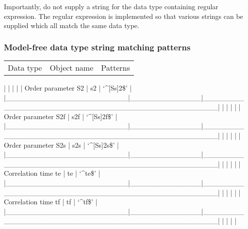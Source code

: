 Importantly, do not supply a string for the data type containing regular expression.  The
regular expression is implemented so that various strings can be supplied which all match
the same data type.


\subsubsection{Model-free data type string matching patterns}



\begin{tabular}{ccc}
Data type & Object name & Patterns \\
\end{tabular}
|                        |              |                                                  |
| Order parameter S2     | s2           | `\^{}[Ss]2\$'                                        |
|\_\_\_\_\_\_\_\_\_\_\_\_\_\_\_\_\_\_\_\_\_\_\_\_|\_\_\_\_\_\_\_\_\_\_\_\_\_\_|\_\_\_\_\_\_\_\_\_\_\_\_\_\_\_\_\_\_\_\_\_\_\_\_\_\_\_\_\_\_\_\_\_\_\_\_\_\_\_\_\_\_\_\_\_\_\_\_\_\_|
|                        |              |                                                  |
| Order parameter S2f    | s2f          | `\^{}[Ss]2f\$'                                       |
|\_\_\_\_\_\_\_\_\_\_\_\_\_\_\_\_\_\_\_\_\_\_\_\_|\_\_\_\_\_\_\_\_\_\_\_\_\_\_|\_\_\_\_\_\_\_\_\_\_\_\_\_\_\_\_\_\_\_\_\_\_\_\_\_\_\_\_\_\_\_\_\_\_\_\_\_\_\_\_\_\_\_\_\_\_\_\_\_\_|
|                        |              |                                                  |
| Order parameter S2s    | s2s          | `\^{}[Ss]2s\$'                                       |
|\_\_\_\_\_\_\_\_\_\_\_\_\_\_\_\_\_\_\_\_\_\_\_\_|\_\_\_\_\_\_\_\_\_\_\_\_\_\_|\_\_\_\_\_\_\_\_\_\_\_\_\_\_\_\_\_\_\_\_\_\_\_\_\_\_\_\_\_\_\_\_\_\_\_\_\_\_\_\_\_\_\_\_\_\_\_\_\_\_|
|                        |              |                                                  |
| Correlation time te    | te           | `\^{}te\$'                                           |
|\_\_\_\_\_\_\_\_\_\_\_\_\_\_\_\_\_\_\_\_\_\_\_\_|\_\_\_\_\_\_\_\_\_\_\_\_\_\_|\_\_\_\_\_\_\_\_\_\_\_\_\_\_\_\_\_\_\_\_\_\_\_\_\_\_\_\_\_\_\_\_\_\_\_\_\_\_\_\_\_\_\_\_\_\_\_\_\_\_|
|                        |              |                                                  |
| Correlation time tf    | tf           | `\^{}tf\$'                                           |
|\_\_\_\_\_\_\_\_\_\_\_\_\_\_\_\_\_\_\_\_\_\_\_\_|\_\_\_\_\_\_\_\_\_\_\_\_\_\_|\_\_\_\_\_\_\_\_\_\_\_\_\_\_\_\_\_\_\_\_\_\_\_\_\_\_\_\_\_\_\_\_\_\_\_\_\_\_\_\_\_\_\_\_\_\_\_\_\_\_|
|                        |              |                                                  |
